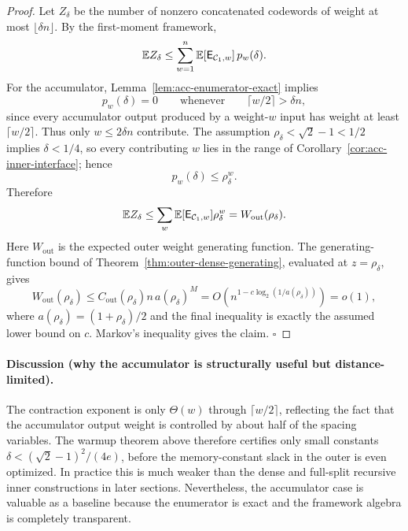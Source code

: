 \begin{proof}
Let \(Z_\delta\) be the number of nonzero concatenated codewords of weight at most \(\lfloor\delta n\rfloor\).
By the first-moment framework,
\[
\mathbb{E} Z_\delta
\le
\sum_{w=1}^{n}\mathbb{E}[\mathsf{E}_{{\mathcal{C}_1},w}]\,p_w(\delta).
\]
For the accumulator, Lemma~\ref{lem:acc-enumerator-exact} implies
\[
p_w(\delta)=0
\qquad\text{whenever}\qquad
\lceil w/2\rceil>\delta n,
\]
since every accumulator output produced by a weight-\(w\) input has weight at least \(\lceil w/2\rceil\).
Thus only \(w\le 2\delta n\) contribute.  The assumption \(\rho_\delta<\sqrt2-1<1/2\) implies
\(\delta<1/4\), so every contributing \(w\) lies in the range of Corollary~\ref{cor:acc-inner-interface}; hence
\[
p_w(\delta)\le \rho_\delta^w.
\]
Therefore
\[
\mathbb{E} Z_\delta
\le
\sum_w \mathbb{E}[\mathsf{E}_{{\mathcal{C}_1},w}]\rho_\delta^w
=
W_{\mathrm{out}}(\rho_\delta).
\]
Here \(W_{\mathrm{out}}\) is the expected outer weight generating function.  The generating-function bound of
Theorem~\ref{thm:outer-dense-generating}, evaluated at \(z=\rho_\delta\), gives
\[
W_{\mathrm{out}}(\rho_\delta)
\le
C_{\mathrm{out}}(\rho_\delta)n\,a(\rho_\delta)^M
=
O\!\left(n^{1-c\log_2(1/a(\rho_\delta))}\right)
=o(1),
\]
where \(a(\rho_\delta)=(1+\rho_\delta)/2\) and the final inequality is exactly the assumed lower bound on \(c\).
Markov's inequality gives the claim. \(\square\)
\end{proof}

\paragraph{Discussion (why the accumulator is structurally useful but distance-limited).}
The contraction exponent is only \(\Theta(w)\) through \(\lceil w/2\rceil\), reflecting the fact that the accumulator output weight
is controlled by about half of the spacing variables.  The warmup theorem above therefore certifies only small constants
\(\delta<(\sqrt2-1)^2/(4e)\), before the memory-constant slack in the outer is even optimized.  In practice this is much
weaker than the dense and full-split recursive inner constructions in later sections.
Nevertheless, the accumulator case is valuable as a baseline because the enumerator is exact and the framework algebra is completely transparent.
